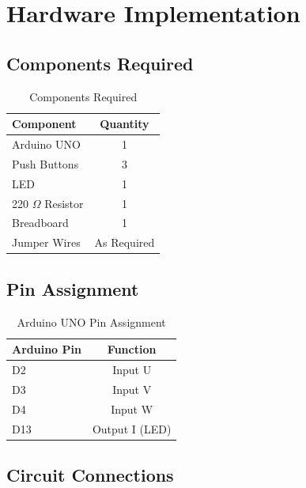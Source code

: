 \documentclass[12pt,a4paper]{article}
\begin{document}
\section{Hardware Implementation}

\subsection{Components Required}

\begin{table}[H]
\centering
\begin{tabular}{lc}
\toprule
\textbf{Component} & \textbf{Quantity} \\
\midrule
Arduino UNO & 1 \\
Push Buttons & 3 \\
LED & 1 \\
220 $\Omega$ Resistor & 1 \\
Breadboard & 1 \\
Jumper Wires & As Required \\
\bottomrule
\end{tabular}
\caption{Components Required}
\end{table}

\subsection{Pin Assignment}

\begin{table}[H]
\centering
\begin{tabular}{lc}
\toprule
\textbf{Arduino Pin} & \textbf{Function} \\
\midrule
D2 & Input U \\
D3 & Input V \\
D4 & Input W \\
D13 & Output I (LED) \\
\bottomrule
\end{tabular}
\caption{Arduino UNO Pin Assignment}
\end{table}

\newpage
\subsection{Circuit Connections}
\end{document}

